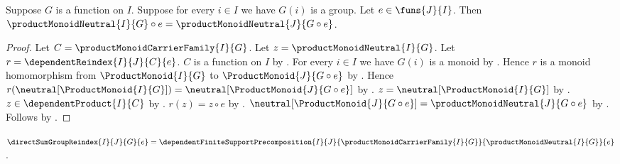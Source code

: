 \begin{proposition}\label{product_group_neutral_reindex}
    Suppose $G$ is a function on $I$.
    Suppose for every $i\in I$ we have $G(i)$ is a group.
    Let $e\in\funs{J}{I}$.
    Then
        $\productMonoidNeutral{I}{G}\circ e
            =\productMonoidNeutral{J}{G\circ e}$.
\end{proposition}
\begin{proof}
    Let $C=\productMonoidCarrierFamily{I}{G}$.
    Let $z=\productMonoidNeutral{I}{G}$.
    Let $r=\dependentReindex{I}{J}{C}{e}$.
    $C$ is a function on $I$ by
        .
    For every $i\in I$ we have $G(i)$ is a monoid by
        .
    Hence $r$ is a monoid homomorphism from $\ProductMonoid{I}{G}$ to
        $\ProductMonoid{J}{G\circ e}$ by
        .
    Hence
        $r(\neutral[\ProductMonoid{I}{G}])
            =\neutral[\ProductMonoid{J}{G\circ e}]$ by
        .
    $z=\neutral[\ProductMonoid{I}{G}]$ by
        .
    $z\in\dependentProduct{I}{C}$ by
        .
    $r(z)=z\circ e$ by .
    $\neutral[\ProductMonoid{J}{G\circ e}]
        =\productMonoidNeutral{J}{G\circ e}$ by
        .
    Follows by \auto.
\end{proof}

\begin{definition}\label{direct_sum_group_reindex}
    $\directSumGroupReindex{I}{J}{G}{e}
        =\dependentFiniteSupportPrecomposition{I}{J}{
            \productMonoidCarrierFamily{I}{G}}{
            \productMonoidNeutral{I}{G}}{e}$.
\end{definition}


